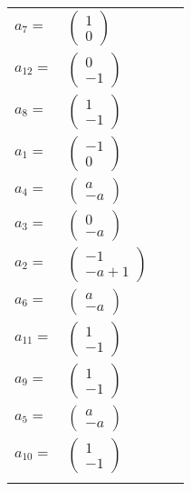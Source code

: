 \documentclass[1p]{elsarticle_modified}
\theoremstyle{definition}
\begin{document}
\begin{tabular}{m{7pt} m{180pt} m{7pt} m{180pt} }
\flushright $a_{7}=$&$\begin{pmatrix}1\\0\end{pmatrix}$ \\
\flushright $a_{12}=$&$\begin{pmatrix}0\\-1\end{pmatrix}$ \\
\flushright $a_{8}=$&$\begin{pmatrix}1\\-1\end{pmatrix}$ \\
\flushright $a_{1}=$&$\begin{pmatrix}-1\\0\end{pmatrix}$ \\
\flushright $a_{4}=$&$\begin{pmatrix}a\\- a\end{pmatrix}$ \\
\flushright $a_{3}=$&$\begin{pmatrix}0\\- a\end{pmatrix}$ \\
\flushright $a_{2}=$&$\begin{pmatrix}-1\\- a+1\end{pmatrix}$ \\
\flushright $a_{6}=$&$\begin{pmatrix}a\\- a\end{pmatrix}$ \\
\flushright $a_{11}=$&$\begin{pmatrix}1\\-1\end{pmatrix}$ \\
\flushright $a_{9}=$&$\begin{pmatrix}1\\-1\end{pmatrix}$ \\
\flushright $a_{5}=$&$\begin{pmatrix}a\\- a\end{pmatrix}$ \\
\flushright $a_{10}=$&$\begin{pmatrix}1\\-1\end{pmatrix}$\\&\end{tabular}
\end{document}
